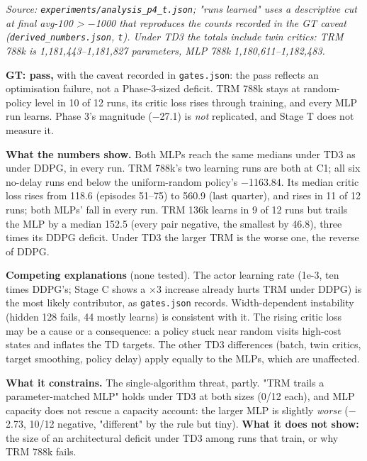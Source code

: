 \documentclass[11pt]{article}
\begin{document}
\emph{Source: \texttt{experiments/\allowbreak{}analysis\_\allowbreak{}p4\_\allowbreak{}t.\allowbreak{}json}; "runs learned" uses a descriptive cut at final avg-100 > $-$1000 that reproduces the counts recorded in the GT caveat (\texttt{derived\_\allowbreak{}numbers.\allowbreak{}json}, \texttt{t}). Under TD3 the totals include twin critics: TRM 788k is 1,181,443--1,181,827 parameters, MLP 788k 1,180,611--1,182,483.}



\textbf{GT: pass,} with the caveat recorded in \texttt{gates.json}: the pass reflects an optimisation failure, not a Phase-3-sized deficit. TRM 788k stays at random-policy level in 10 of 12 runs, its critic loss rises through training, and every MLP run learns. Phase 3's magnitude ($-$27.1) is \emph{not} replicated, and Stage T does not measure it.



\textbf{What the numbers show.} Both MLPs reach the same medians under TD3 as under DDPG, in every run. TRM 788k's two learning runs are both at C1; all six no-delay runs end below the uniform-random policy's $-$1163.84. Its median critic loss rises from 118.6 (episodes 51--75) to 560.9 (last quarter), and rises in 11 of 12 runs; both MLPs' fall in every run. TRM 136k learns in 9 of 12 runs but trails the MLP by a median 152.5 (every pair negative, the smallest by 46.8), three times its DDPG deficit. Under TD3 the larger TRM is the worse one, the reverse of DDPG.



\textbf{Competing explanations} (none tested). The actor learning rate (1e-3, ten times DDPG's; Stage C shows a $\times$3 increase already hurts TRM under DDPG) is the most likely contributor, as \texttt{gates.json} records. Width-dependent instability (hidden 128 fails, 44 mostly learns) is consistent with it. The rising critic loss may be a cause or a consequence: a policy stuck near random visits high-cost states and inflates the TD targets. The other TD3 differences (batch, twin critics, target smoothing, policy delay) apply equally to the MLPs, which are unaffected.



\textbf{What it constrains.} The single-algorithm threat, partly. "TRM trails a parameter-matched MLP" holds under TD3 at both sizes (0/12 each), and MLP capacity does not rescue a capacity account: the larger MLP is slightly \emph{worse} ($-$2.73, 10/12 negative, "different" by the rule but tiny). \textbf{What it does not show:} the size of an architectural deficit under TD3 among runs that train, or why TRM 788k fails.
\end{document}
